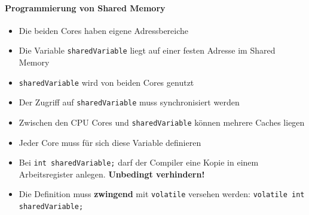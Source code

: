 \paragraph{Programmierung von Shared Memory}
\begin{minipage}[c]{14cm}
	\begin{itemize}
		\item Die beiden Cores haben eigene Adressbereiche
		\item Die Variable \lstinline{sharedVariable} liegt auf einer festen Adresse im Shared Memory
		\item \lstinline{sharedVariable} wird von beiden Cores genutzt
		\item  Der Zugriff auf \lstinline{sharedVariable} muss synchronisiert werden
		\item Zwischen den CPU Cores und \lstinline{sharedVariable} können mehrere Caches liegen
		\item Jeder Core muss für sich diese Variable definieren
		\item Bei \lstinline{int sharedVariable;} darf der Compiler eine Kopie in einem Arbeitsregister anlegen. \textbf{Unbedingt verhindern!}
		\item Die Definition muss \textbf{zwingend} mit \lstinline{volatile} versehen werden: \lstinline{volatile int sharedVariable;}
	\end{itemize}
\end{minipage}
